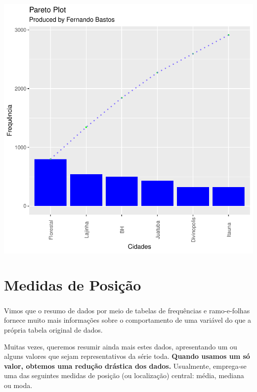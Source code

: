 \documentclass[14pt,aspectratio=1610]{beamer}
\begin{document}
\begin{frame}{}
\frametitle{}
\begin{block}{}

\begin{center}
\includegraphics{Aula1-ogiva}
\end{center}
\end{block}
\end{frame}

\section{Medidas de Posição}
\begin{frame}{}
\frametitle{}
\begin{block}{}
\justifying
Vimos que o resumo de dados por meio de tabelas de frequências e ramo-e-folhas fornece
muito mais informações sobre o comportamento de uma variável do que a própria tabela
original de dados. 
\end{block}
\pause
\begin{block}{}
\justifying
Muitas vezes, queremos resumir ainda mais estes dados, apresentando um ou alguns valores que sejam representativos da série toda. \textbf{Quando usamos um só 
valor, obtemos uma redução drástica dos dados.} Usualmente, emprega-se uma das seguintes medidas de posição (ou localização) central: média, mediana ou moda.
\end{block}
\end{frame}
\end{document}
